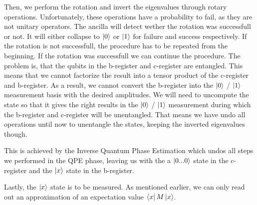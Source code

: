 Then, we perform the rotation and invert the eigenvalues through rotary operations. 
Unfortunately, these operations have a probability to fail, as they are not unitary operators.
The ancilla will detect wether the rotation was successfull or not.
It will either collapse to $\ket0$ or $\ket1$ for failure and success respectively.
If the rotation is not successfull, the procedure has to be repeated from the beginning. 
If the rotation was successfull we can continue the procedure. 
The problem is, that the qubits in the b-register and c-register are entangled. 
This means that we cannot factorize the result into a tensor product of the c-register and b-register.
As a result, we cannot convert the b-register into the $\ket 0$ / $\ket 1$ measurement basis with the desired amplitudes.
We will need to uncompute the state so that it gives the right results in the $\ket 0$ / $\ket 1$ measurement during which the b-register and c-register will be unentangled.
That means we have undo all operations until now to unentangle the states, keeping the inverted eigenvalues though.

This is achieved by the Inverse Quantum Phase Estimation which undos all steps we performed in the QPE phase, leaving us with the a $\ket{0...0}$ state in the c-register and the $\ket x$ state in the b-register.

Lastly, the $\ket x$ state is to be measured. As mentioned earlier, we can only read out an approximation of an expectation value $\bra x M \ket x$.
